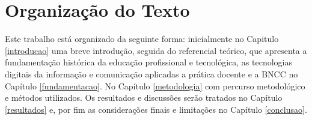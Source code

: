 \section{Organização do Texto}
\label{organizacao_texto}

Este trabalho está organizado da seguinte forma: inicialmente no Capitulo \ref{introducao} uma breve introdução, seguida do referencial teórico, que apresenta a fundamentação histórica da educação profissional e tecnológica, as tecnologias digitais da informação e comunicação aplicadas a prática docente e a BNCC no Capítulo \ref{fundamentacao}. No Capítulo \ref{metodologia} com percurso metodológico e métodos utilizados. Os resultados e discussões serão tratados no  Capítulo \ref{resultados} e, por fim as considerações finais e limitações no Capítulo \ref{conclusao}.

